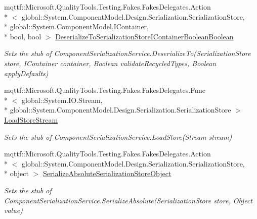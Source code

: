 \begin{DoxyCompactItemize}
mqttf\-::\-Microsoft.\-Quality\-Tools.\-Testing.\-Fakes.\-Fakes\-Delegates.\-Action\\*
$<$ global\-::\-System.\-Component\-Model.\-Design.\-Serialization.\-Serialization\-Store, \\*
global\-::\-System.\-Component\-Model.\-I\-Container, \\*
bool, bool $>$ \hyperlink{class_system_1_1_component_model_1_1_design_1_1_serialization_1_1_fakes_1_1_stub_component_serialization_service_af0a424d1d4ac4e7e39a7e05f537acd01}{Deserialize\-To\-Serialization\-Store\-I\-Container\-Boolean\-Boolean}
\begin{DoxyCompactList}\small\item\em Sets the stub of Component\-Serialization\-Service.\-Deserialize\-To(\-Serialization\-Store store, I\-Container container, Boolean validate\-Recycled\-Types, Boolean apply\-Defaults)\end{DoxyCompactList}\item 
mqttf\-::\-Microsoft.\-Quality\-Tools.\-Testing.\-Fakes.\-Fakes\-Delegates.\-Func\\*
$<$ global\-::\-System.\-I\-O.\-Stream, \\*
global\-::\-System.\-Component\-Model.\-Design.\-Serialization.\-Serialization\-Store $>$ \hyperlink{class_system_1_1_component_model_1_1_design_1_1_serialization_1_1_fakes_1_1_stub_component_serialization_service_a0241cde865e2ba1d4eddbac2cf5cd9fd}{Load\-Store\-Stream}
\begin{DoxyCompactList}\small\item\em Sets the stub of Component\-Serialization\-Service.\-Load\-Store(\-Stream stream)\end{DoxyCompactList}\item 
mqttf\-::\-Microsoft.\-Quality\-Tools.\-Testing.\-Fakes.\-Fakes\-Delegates.\-Action\\*
$<$ global\-::\-System.\-Component\-Model.\-Design.\-Serialization.\-Serialization\-Store, \\*
object $>$ \hyperlink{class_system_1_1_component_model_1_1_design_1_1_serialization_1_1_fakes_1_1_stub_component_serialization_service_aeb9c42adc33f35979c81640eea116734}{Serialize\-Absolute\-Serialization\-Store\-Object}
\begin{DoxyCompactList}\small\item\em Sets the stub of Component\-Serialization\-Service.\-Serialize\-Absolute(\-Serialization\-Store store, Object value)\end{DoxyCompactList}\item 

\end{DoxyCompactItemize}

